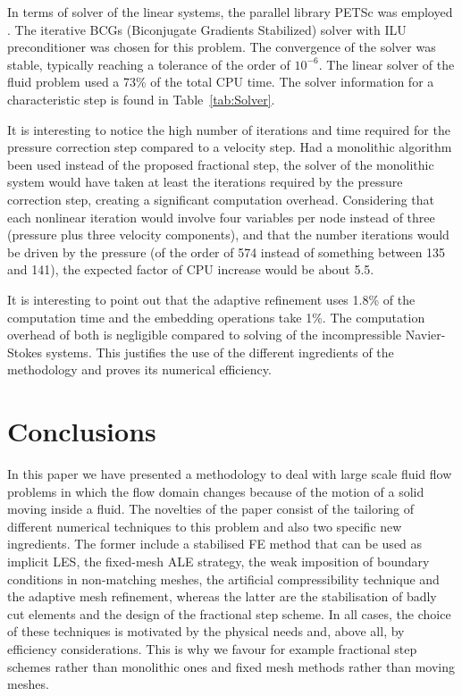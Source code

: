 \documentclass[11pt,a4paper,oneside,reqno]{amsart}
\begin{document}
In terms of solver of the linear systems, the parallel library PETSc was employed \cite{PETScHomePage}. The iterative BCGs (Biconjugate Gradients Stabilized) \cite{BiconjugateGradientSolver} solver with ILU preconditioner was chosen for this problem. The convergence of the solver was stable, typically reaching a tolerance of the order of $10^{-6}$. The linear solver of the fluid problem used a 73\% of the total CPU time. The solver information for a characteristic step is found in Table~\ref{tab:Solver}.

It is interesting to notice the high number of iterations and time required for the pressure correction step compared to a velocity step. Had a monolithic algorithm been used instead of the proposed fractional step, the solver of the monolithic system would have taken at least the iterations required by the pressure correction step, creating a significant computation overhead. Considering that each nonlinear iteration would involve four variables per node instead of three (pressure plus three velocity components), and that the number iterations would be driven by the pressure (of the order of 574 instead of something between 135 and 141), the expected factor of CPU increase would be about 5.5. 

It is interesting to point out that the adaptive refinement uses 1.8\% of the computation time and the embedding operations take 1\%. The computation overhead of both is negligible compared to solving of the incompressible Navier-Stokes systems. This justifies the use of the different ingredients of the methodology and proves its numerical efficiency.

\section{Conclusions}\label{sec:conclu}

In this paper we have presented a methodology to deal with large scale fluid flow problems in which the flow domain changes because of the motion of a solid moving inside a fluid. The novelties of the paper consist of the tailoring of different numerical techniques to this problem and also two specific new ingredients. The former include a stabilised FE method that can be used as implicit LES, the fixed-mesh ALE strategy, the weak imposition of boundary conditions in non-matching meshes, the artificial compressibility technique and the adaptive mesh refinement, whereas the latter are the stabilisation of badly cut elements and the design of the fractional step scheme. In all cases, the choice of these techniques is motivated by the physical needs and, above all, by efficiency considerations. This is why we favour for example fractional step schemes rather than monolithic ones and fixed mesh methods rather than moving meshes.
\end{document}
